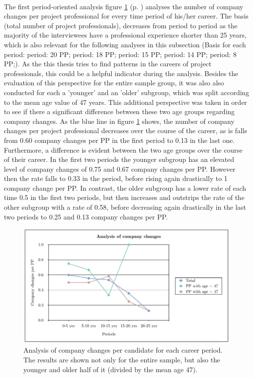 \\[.1cm]
The first period-oriented analysis figure \ref{fig:analy_CC} (p. \pageref{fig:analy_CC}) analyses the number of company changes per project professional for every time period of his/her career. The basis (total number of project professionals), decreases from period to period as the majority of the interviewees have a professional experience shorter than 25 years, which is also relevant for the following analyses in this subsection (Basis for each period:  period: 20 PP;  period: 18 PP;  period: 15 PP;  period: 14 PP;  period: 8 PP;). As the this thesis tries to find patterns in the careers of project professionals, this could be a helpful indicator during the analysis. Besides the evaluation of this perspective for the entire sample group, it was also also conducted for each a 'younger' and an 'older' subgroup, which was split according to the  mean age value of 47 years. This additional perspective was taken in order to see if there a significant difference between these two age groups regarding company changes. As the blue line in figure \ref{fig:analy_CC} shows, the number of company changes per project professional decreases over the course of the career, as is falls from 0.60 company changes per PP in the first period to 0.13 in the last one. Furthermore, a difference is evident between the two age groups over the course of their career. In the first two periods the younger subgroup has an elevated level of company changes of 0.75  and 0.67 company changes per PP. However then the rate falls to 0.33 in the  period, before rising again drastically to 1 company  change per PP. In contrast, the older subgroup has a lower rate of each time 0.5 in the first two periods, but then increases and outstrips the rate of the other subgroup with a rate of 0.58, before decreasing again drastically in the last two periods to 0.25 and 0.13 company changes per PP.  \\

\begin{figure}[!hbt]
    \captionsetup{font=small}
  \centering
  \includegraphics[width=.6\columnwidth]{figures/Analysis_CC.png}
  \caption[Analysis of company changes]{Analysis of company changes per candidate for each career period. The results are shown not only for the entire sample, but also the younger and older half of it (divided by the mean age 47).}
  \label{fig:analy_CC}
\end{figure}


